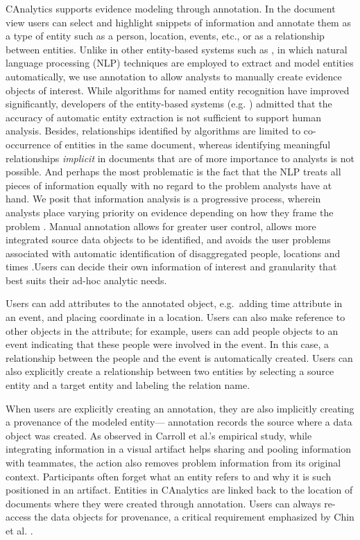 CAnalytics supports evidence modeling through annotation. In the
document view users can select and highlight snippets of information and
annotate them as a type of entity such as a person, location, events,
etc., or as a relationship between entities. Unlike in other
entity-based systems such as \autocites{Bier2010}{Stasko2008}, in which
natural language processing (NLP) techniques are employed to extract and
model entities automatically, we use annotation to allow analysts to
manually create evidence objects of interest. While algorithms for named
entity recognition have improved significantly, developers of the
entity-based systems (e.g. \autocite{Gorg2014}) admitted that the
accuracy of automatic entity extraction is not sufficient to support
human analysis. Besides, relationships identified by algorithms are
limited to co-occurrence of entities in the same document, whereas
identifying meaningful relationships \emph{implicit} in documents that
are of more importance to analysts is not possible. And perhaps the most
problematic is the fact that the NLP treats all pieces of information
equally with no regard to the problem analysts have at hand. We posit
that information analysis is a progressive process, wherein analysts
place varying priority on evidence depending on how they frame the
problem \autocite{Heuer1999}. Manual annotation allows for greater user
control, allows more integrated source data objects to be identified,
and avoids the user problems associated with automatic identification of
disaggregated people, locations and times \autocite{Bier2008}.Users can
decide their own information of interest and granularity that best suits
their ad-hoc analytic needs.

Users can add attributes to the annotated object, e.g.~adding time
attribute in an event, and placing coordinate in a location. Users can
also make reference to other objects in the attribute; for example,
users can add people objects to an event indicating that these people
were involved in the event. In this case, a relationship between the
people and the event is automatically created. Users can also explicitly
create a relationship between two entities by selecting a source entity
and a target entity and labeling the relation name.

When users are explicitly creating an annotation, they are also
implicitly creating a provenance of the modeled entity--- annotation
records the source where a data object was created. As observed in
Carroll et al.'s \autocite{Carroll2013} empirical study, while
integrating information in a visual artifact helps sharing and pooling
information with teammates, the action also removes problem information
from its original context. Participants often forget what an entity
refers to and why it is such positioned in an artifact. Entities in
CAnalytics are linked back to the location of documents where they were
created through annotation. Users can always re-access the data objects
for provenance, a critical requirement emphasized by Chin et al.
\autocite{Chin2009}.

